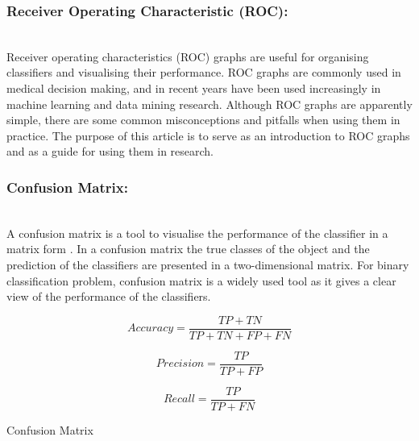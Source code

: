 \subsubsection{Receiver Operating Characteristic (ROC):}\hspace*{\fill} \\
Receiver operating characteristics (ROC) graphs are useful for organising classifiers and visualising their performance. ROC graphs are commonly used in medical decision making, and in recent years have been used increasingly in machine learning and data mining research. Although ROC graphs are apparently simple, there are some common misconceptions and pitfalls when using them in practice. The purpose of this article is to serve as an introduction to ROC graphs and as a guide for using them in research. \cite{FAWCETT2006861}

\subsubsection{Confusion Matrix:}\hspace*{\fill} \\
A confusion matrix is a tool to visualise the performance of the classifier in a matrix form \cite{Ting2017}. In a confusion matrix the true classes of the object and the prediction of the classifiers are presented in a two-dimensional matrix. For binary classification problem, confusion matrix is a widely used tool as it gives a clear view of the performance of the classifiers. 

\begin{equation} \label{eq:aqquracy}
    Accuracy = \frac{TP+TN}{TP+TN+FP+FN}
\end{equation}

\begin{equation} \label{eq:precision}
    Precision = \frac{TP}{TP+FP}
\end{equation}

\begin{equation} \label{eq:recall}
    Recall = \frac{TP}{TP+FN}
\end{equation}


\begin{table}[]
    \centering
    \noindent

    \renewcommand\arraystretch{1.5}
    \setlength\tabcolsep{0pt}
    
    
    
    \caption{Confusion Matrix}
    \label{tab:Confusion Matrix}
\end{table}




